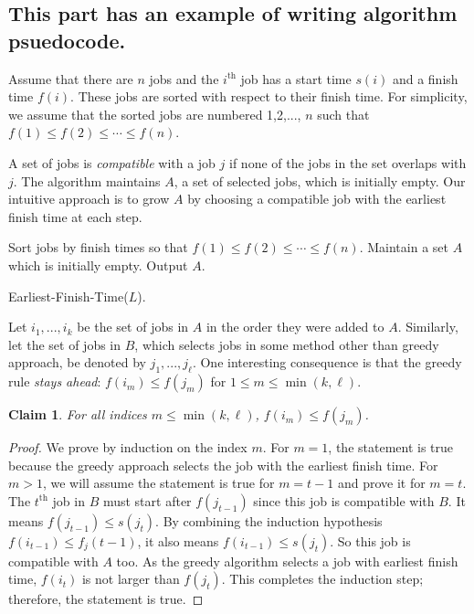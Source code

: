 \documentclass[11pt]{332homework}
\newtheorem{claim}[theorem]{Claim}
\newcommand{\ord}[2][th]{\ensuremath{{#2}^{\mathrm{#1}}}}
\begin{document}
\subsection{This part has an example of writing algorithm psuedocode.}
Assume that there are $n$ jobs and the $\ord{i}$ job has a
start time $s(i)$ and a finish time $f(i)$. These jobs are sorted with
respect to their finish time.
For simplicity, we assume that the sorted jobs are numbered 1,2,...,
$n$ such that $f(1)\leq f(2)\leq \cdots \leq f(n)$.

A set of jobs is \emph{compatible} with a job $j$
if none of the jobs in the set overlaps with $j$.
The algorithm maintains $A$, a set of selected jobs,
which is initially empty.
Our intuitive approach is to grow $A$ by choosing a compatible job
with the earliest finish time at each step.

\begin{algorithm}
\DontPrintSemicolon
{}
\BlankLine
\nl Sort jobs by finish times so that $f(1) \leq f(2) \leq \cdots \leq f(n)$.\;
\nl Maintain a set \(A\) which is initially empty.\;
\nl    {}
\nl Output $A$.
\caption{Earliest-Finish-Time(\(L\)).\label{alg:earliest-finish-time}}
\end{algorithm}



Let $i_1,...,i_k$ be the set of jobs in $A$ in the order they were
added to $A$. Similarly, let the set of jobs in $B$, which selects
jobs in some method other than greedy approach, be denoted by
$j_1,...,j_\ell$.
One interesting consequence is that the greedy rule \emph{stays ahead}:
$f(i_m)\leq f(j_m)$ for $1\leq m\leq \min(k, \ell)$.
\vspace{.1in}
\begin{claim}
  For all indices $m\leq \min(k,\ell)$, $f(i_m)\leq f(j_m)$.
  \label{claim:stay_ahead}
\end{claim}
\begin{proof}
  We prove by induction on the index $m$.
  For $m=1$, the statement is true because the greedy approach selects
  the job with the earliest finish time.
  For $m>1$, we will assume the statement is true for $m=t-1$ and
  prove it for $m=t$. The $\ord{t}$ job in $B$ must start after
  $f(j_{t-1})$ since this job is compatible with $B$. It means
  $f(j_{t-1})\leq s(j_t)$. By combining the induction hypothesis
  $f(i_{t-1})\leq f_j(t-1)$, it also means $f(i_{t-1})\leq s(j_t)$.
  So this job is compatible with $A$ too.
  As the greedy algorithm selects a job with earliest finish time,
  $f(i_t)$ is not larger than $f(j_t)$.
  This completes the induction step; therefore, the statement is true.
\end{proof}
\end{document}
